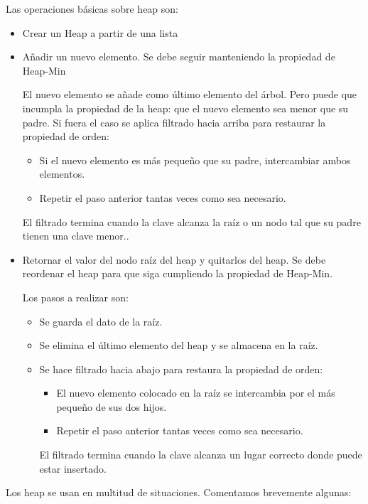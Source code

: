Las operaciones básicas sobre heap son:
\begin{itemize}
\item Crear un Heap a partir de una lista
\item Añadir un nuevo elemento. Se debe seguir manteniendo la propiedad de Heap-Min

El nuevo elemento se añade como último elemento del árbol. Pero puede que incumpla la propiedad de la heap: que el nuevo elemento sea menor que su padre. Si fuera el caso se aplica filtrado hacia arriba para restaurar la propiedad de orden:
\begin{itemize}
\item Si el nuevo elemento es más pequeño que su padre, intercambiar ambos elementos.
\item Repetir el paso anterior tantas veces como sea necesario. 
\end{itemize}

El filtrado termina cuando la clave alcanza la raíz o un nodo tal que su padre tienen una clave menor..

\item Retornar el valor del nodo raíz del heap y quitarlos del heap. Se debe reordenar el heap para que siga cumpliendo la propiedad de Heap-Min.

Los pasos a realizar son:
\begin{itemize}
\item Se guarda el dato de la raíz.
\item Se elimina el último elemento del heap y se almacena en la raíz.
\item Se hace filtrado hacia abajo para restaura la propiedad de orden:
\begin{itemize}
\item El nuevo elemento colocado en la raíz se intercambia por el más pequeño de sus dos hijos.
\item Repetir el paso anterior tantas veces como sea necesario. 
\end{itemize}

El filtrado termina cuando la clave alcanza un lugar correcto donde puede estar insertado.

\end{itemize}
\end{itemize}

Los heap se usan en multitud de situaciones. Comentamos brevemente algunas:


